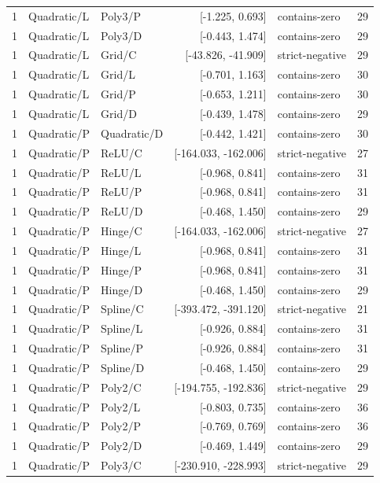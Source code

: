 \begin{longtable}{lllrlr}
1 & Quadratic/L & Poly3/P & [-1.225, 0.693] & contains-zero & 29 \\
1 & Quadratic/L & Poly3/D & [-0.443, 1.474] & contains-zero & 29 \\
1 & Quadratic/L & Grid/C & [-43.826, -41.909] & strict-negative & 29 \\
1 & Quadratic/L & Grid/L & [-0.701, 1.163] & contains-zero & 30 \\
1 & Quadratic/L & Grid/P & [-0.653, 1.211] & contains-zero & 30 \\
1 & Quadratic/L & Grid/D & [-0.439, 1.478] & contains-zero & 29 \\
1 & Quadratic/P & Quadratic/D & [-0.442, 1.421] & contains-zero & 30 \\
1 & Quadratic/P & ReLU/C & [-164.033, -162.006] & strict-negative & 27 \\
1 & Quadratic/P & ReLU/L & [-0.968, 0.841] & contains-zero & 31 \\
1 & Quadratic/P & ReLU/P & [-0.968, 0.841] & contains-zero & 31 \\
1 & Quadratic/P & ReLU/D & [-0.468, 1.450] & contains-zero & 29 \\
1 & Quadratic/P & Hinge/C & [-164.033, -162.006] & strict-negative & 27 \\
1 & Quadratic/P & Hinge/L & [-0.968, 0.841] & contains-zero & 31 \\
1 & Quadratic/P & Hinge/P & [-0.968, 0.841] & contains-zero & 31 \\
1 & Quadratic/P & Hinge/D & [-0.468, 1.450] & contains-zero & 29 \\
1 & Quadratic/P & Spline/C & [-393.472, -391.120] & strict-negative & 21 \\
1 & Quadratic/P & Spline/L & [-0.926, 0.884] & contains-zero & 31 \\
1 & Quadratic/P & Spline/P & [-0.926, 0.884] & contains-zero & 31 \\
1 & Quadratic/P & Spline/D & [-0.468, 1.450] & contains-zero & 29 \\
1 & Quadratic/P & Poly2/C & [-194.755, -192.836] & strict-negative & 29 \\
1 & Quadratic/P & Poly2/L & [-0.803, 0.735] & contains-zero & 36 \\
1 & Quadratic/P & Poly2/P & [-0.769, 0.769] & contains-zero & 36 \\
1 & Quadratic/P & Poly2/D & [-0.469, 1.449] & contains-zero & 29 \\
1 & Quadratic/P & Poly3/C & [-230.910, -228.993] & strict-negative & 29 \\

\end{longtable}
